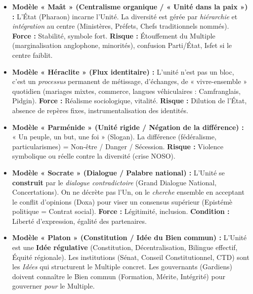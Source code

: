 \documentclass[11pt]{article}
\begin{document}
\begin{exoresolu}
\begin{itemize}
    \item \textbf{Modèle « Maât » (Centralisme organique / « Unité dans la paix ») :} L'État (Pharaon) incarne l'Unité. La diversité est gérée par \emph{hiérarchie} et \emph{intégration} au centre (Ministères, Préfets, Chefs traditionnels nommés). \textbf{Force :} Stabilité, symbole fort. \textbf{Risque :} Étouffement du Multiple (marginalisation anglophone, minorités), confusion Parti/État, Isfet si le centre faiblit.
    \item \textbf{Modèle « Héraclite » (Flux identitaire) :} L'unité n'est pas un bloc, c'est un \emph{processus} permanent de métissage, d'échanges, de « vivre-ensemble » quotidien (mariages mixtes, commerce, langues véhiculaires : Camfranglais, Pidgin). \textbf{Force :} Réalisme sociologique, vitalité. \textbf{Risque :} Dilution de l'État, absence de repères fixes, instrumentalisation des identités.
    \item \textbf{Modèle « Parménide » (Unité rigide / Négation de la différence) :} « Un peuple, un but, une foi » (Slogan). La différence (fédéralisme, particularismes) = Non-être / Danger / Sécession. \textbf{Risque :} Violence symbolique ou réelle contre la diversité (crise NOSO).
    \item \textbf{Modèle « Socrate » (Dialogue / Palabre national) :} L'Unité se \textbf{construit} par le \emph{dialogue contradictoire} (Grand Dialogue National, Concertations). On ne décrète pas l'Un, on le \emph{cherche} ensemble en acceptant le conflit d'opinions (Doxa) pour viser un consensus supérieur (Epistémè politique = Contrat social). \textbf{Force :} Légitimité, inclusion. \textbf{Condition :} Liberté d'expression, égalité des partenaires.
    \item \textbf{Modèle « Platon » (Constitution / Idée du Bien commun) :} L'Unité est une \textbf{Idée régulative} (Constitution, Décentralisation, Bilingue effectif, Équité régionale). Les institutions (Sénat, Conseil Constitutionnel, CTD) sont les \emph{Idées} qui structurent le Multiple concret. Les gouvernants (Gardiens) doivent connaître le Bien commun (Formation, Mérite, Intégrité) pour gouverner \emph{pour} le Multiple.
\end{itemize}


\end{exoresolu}
\end{document}
